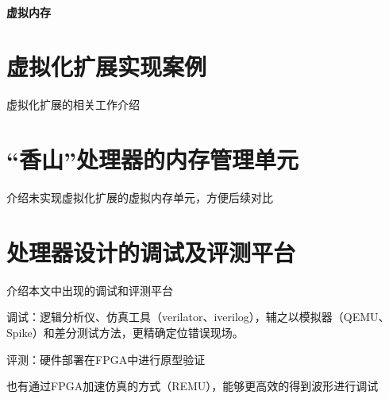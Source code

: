 \paragraph{虚拟内存}

\section{虚拟化扩展实现案例}
虚拟化扩展的相关工作介绍

\section{“香山”处理器的内存管理单元}
介绍未实现虚拟化扩展的虚拟内存单元，方便后续对比

\section{处理器设计的调试及评测平台}
介绍本文中出现的调试和评测平台

调试：逻辑分析仪、仿真工具（verilator、iverilog），辅之以模拟器（QEMU、Spike）和差分测试方法，更精确定位错误现场。

评测：硬件部署在FPGA中进行原型验证

也有通过FPGA加速仿真的方式（REMU），能够更高效的得到波形进行调试